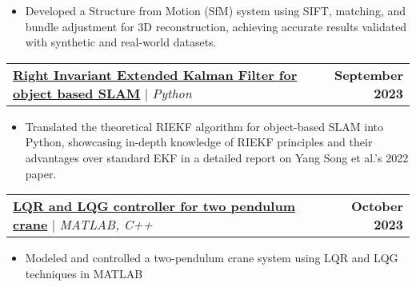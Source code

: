 \documentclass[letterpaper,10pt]{article}
\makeatletter
\newcommand{\resumeItem}[1]{
  \item\small{
    {#1 \vspace{-2pt}}
  }
}
\newcommand{\resumeProjectHeading}[2]{
    \item
    \begin{tabular*}{1.001\textwidth}{l@{\extracolsep{\fill}}r}
      \small#1 & \textbf{\small #2}\\
    \end{tabular*}\vspace{-7pt}
}
\newcommand{\resumeItemListStart}{\begin{itemize}}
\newcommand{\resumeItemListEnd}{\end{itemize}\vspace{-5pt}}
\makeatother
\begin{document}
          \resumeItemListStart
            \justifying
            \resumeItem{Developed a Structure from Motion (SfM) system using SIFT, matching, and bundle adjustment for 3D reconstruction, achieving accurate results validated with synthetic and real-world datasets.}
          \resumeItemListEnd
          \vspace{-13pt}
        \resumeProjectHeading
          {\href{https://github.com/MayankD409/RIEKF_Python.git}{\textbf{Right Invariant Extended Kalman Filter for object based SLAM}} $|$ \emph{Python}}{September 2023}
          \resumeItemListStart
            \justifying
            \resumeItem{Translated the theoretical RIEKF algorithm for object-based SLAM into Python, showcasing in-depth knowledge of RIEKF principles and their advantages over standard EKF in a detailed report on Yang Song et al.'s 2022 paper.}
          \resumeItemListEnd
          \vspace{-13pt}
        \resumeProjectHeading
          {\href{https://github.com/MayankD409/Two_Pendulum_Crane.git}{\textbf{LQR and LQG controller for two pendulum crane}} $|$ \emph{MATLAB, C++}}{October 2023}
          \resumeItemListStart
          \justifying
            \resumeItem{Modeled and controlled a two-pendulum crane system using LQR and LQG techniques in MATLAB}
          \resumeItemListEnd
          \vspace{-13pt}


          
\end{document}

